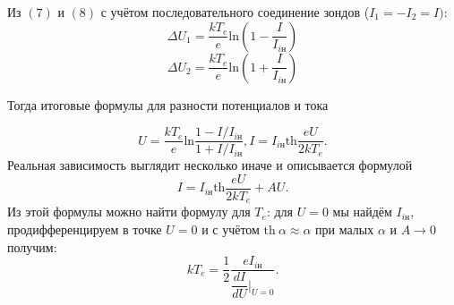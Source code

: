 \documentclass[a4paper,11pt]{extarticle} %
\begin{document}
Из $(7)$ и $(8)$ с учётом последовательного соединение зондов ($I_1 = -I_2 = I)$:
$$
\Delta U_1= \dfrac{kT_e}{e}\text{ln}\left(1 - \dfrac{I}{I_{i\text{н}}}\right)
$$
$$
\Delta U_2= \dfrac{kT_e}{e}\text{ln}\left(1 + \dfrac{I}{I_{i\text{н}}}\right)
$$

Тогда итоговые формулы для разности потенциалов и тока

\begin{equation}
U = \dfrac{kT_e}{e}\text{ln}\dfrac{1 - I/I_{i\text{н}}}{1 + I/I_{i\text{н}}}, 
I = I_{i\text{н}} \text{th}\dfrac{eU}{2kT_e}.
\end{equation}
Реальная зависимость выглядит несколько иначе и описывается формулой 
\begin{equation}
I = I_{i\text{н}} \text{th}\dfrac{eU}{2kT_e} + AU.
\end{equation}
Из этой формулы можно найти формулу для $T_e$: для $U=0$ мы найдём $I_{i\text{н}}$, продифференцируем в точке $U=0$ и с учётом $\text{th}~\alpha \approx \alpha$ при малых $\alpha$ и $A\rightarrow 0$ получим:
\begin{equation}
kT_e = \dfrac{1}{2}\dfrac{eI_{i\text{н}}}{\dfrac{dI}{dU}|_{U=0}}.
\end{equation}
\end{document}
